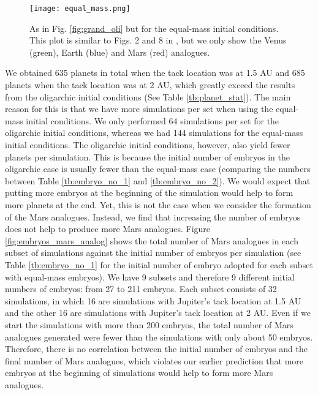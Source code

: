 \documentclass{aa}
\begin{document}
\begin{figure*}
\sidecaption
\texttt{[image: equal\_mass.png]}
\caption{As in Fig. \ref{fig:grand_oli} but for the equal-mass initial conditions. This plot is similar to Figs. 2 and 8 in \cite{brasser2017cool}, but we only show the Venus (green), Earth (blue) and Mars (red) analogues.}

\label{fig:equal_mass}

\end{figure*} 

We obtained 635 planets in total when the tack location was at 1.5 AU and 685 planets when the tack location was at 2 AU, which greatly exceed the results from the oligarchic initial conditions (See Table \ref{tb:planet_stat}). The main reason for this is that we have more simulations per set when using the equal-mass initial conditions. We only performed 64 simulations per set for the oligarchic initial conditions, whereas we had 144 simulations for the equal-mass initial conditions. The oligarchic initial conditions, however, also yield fewer planets per simulation. This is because the initial number of embryos in the oligarchic case is usually fewer than the equal-mass case (comparing the numbers between Table \ref{tb:embryo_no_1} and \ref{tb:embryo_no_2}). We would expect that putting more embryos at the beginning of the simulation would help to form more planets at the end. Yet, this is not the case when we consider the formation of the Mars analogues. Instead, we find that increasing the number of embryos does not help to produce more Mars analogues. Figure \ref{fig:embryos_mars_analog} shows the total number of Mars analogues in each subset of simulations against the initial number of embryos per simulation (see Table \ref{tb:embryo_no_1} for the initial number of embryo adopted for each subset with equal-mass embryos). We have 9 subsets and therefore 9 different initial numbers of embryos: from 27 to 211 embryos. Each subset consists of 32 simulations, in which 16 are simulations with Jupiter’s tack location at 1.5 AU and the other 16 are simulations with Jupiter’s tack location at 2 AU. Even if we start the simulations with more than 200 embryos, the total number of Mars analogues generated were fewer than the simulations with only about 50 embryos. Therefore, there is no correlation between the initial number of embryos and the final number of Mars analogues, which violates our earlier prediction that more embryos at the beginning of simulations would help to form more Mars analogues.
\end{document}
